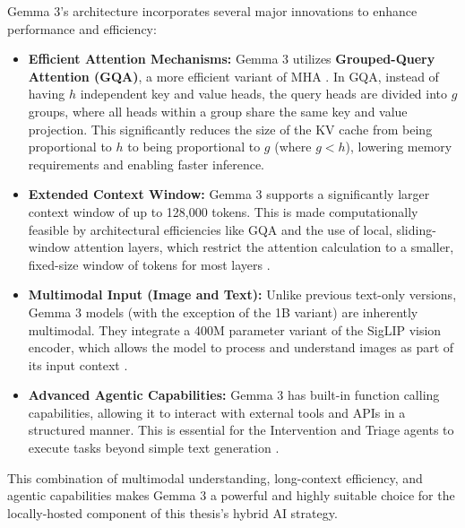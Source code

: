 Gemma 3's architecture incorporates several major innovations to enhance performance and efficiency:
\begin{itemize}
    \item \textbf{Efficient Attention Mechanisms:} Gemma 3 utilizes \textbf{Grouped-Query Attention (GQA)}, a more efficient variant of MHA \cite{FIND_CITATION_PLEASE}. In GQA, instead of having $h$ independent key and value heads, the query heads are divided into $g$ groups, where all heads within a group share the same key and value projection. This significantly reduces the size of the KV cache from being proportional to $h$ to being proportional to $g$ (where $g < h$), lowering memory requirements and enabling faster inference.
    \item \textbf{Extended Context Window:} Gemma 3 supports a significantly larger context window of up to 128,000 tokens. This is made computationally feasible by architectural efficiencies like GQA and the use of local, sliding-window attention layers, which restrict the attention calculation to a smaller, fixed-size window of tokens for most layers \cite{FIND_CITATION_PLEASE}.
    \item \textbf{Multimodal Input (Image and Text):} Unlike previous text-only versions, Gemma 3 models (with the exception of the 1B variant) are inherently multimodal. They integrate a 400M parameter variant of the SigLIP vision encoder, which allows the model to process and understand images as part of its input context \cite{FIND_CITATION_PLEASE}.
    \item \textbf{Advanced Agentic Capabilities:} Gemma 3 has built-in function calling capabilities, allowing it to interact with external tools and APIs in a structured manner. This is essential for the Intervention and Triage agents to execute tasks beyond simple text generation \cite{FIND_CITATION_PLEASE}.
\end{itemize}
This combination of multimodal understanding, long-context efficiency, and agentic capabilities makes Gemma 3 a powerful and highly suitable choice for the locally-hosted component of this thesis's hybrid AI strategy.


